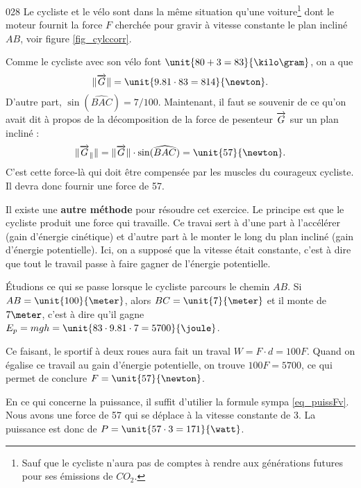 \begin{corrige}{028}
Le cycliste et le vélo sont dans la même situation qu'une voiture\footnote{Sauf que le cycliste n'aura pas de comptes à rendre aux générations futures pour ses émissions de $CO_2$.} dont le moteur fournit la force $F$ cherchée pour gravir à vitesse constante le plan incliné $AB$, voir figure \ref{fig_cylccorr}. 

Comme le cycliste avec son vélo font $\unit{80+3=83}{\kilo\gram}$, on a que
\[
 \| \fG \|=\unit{9.81\cdot 83=814}{\newton}.
\]
 D'autre part, $\sin(\widehat{BAC})=7/100$. Maintenant, il faut se souvenir de ce qu'on avait dit à propos de la décomposition de la force de pesenteur $\overrightarrow{G}$ sur un plan incliné :
\[ 
  \| \fG_{\parallel}\|=\| \fG \|\cdot\sin(\widehat{BAC}) =\unit{57}{\newton}. 
\]
C'est cette force-là qui doit être compensée par les muscles du courageux cycliste. Il devra donc fournir une force de \unit{57}{\newton}.


Il existe une {\bf autre méthode} pour résoudre cet exercice. Le principe est que le cycliste produit une force qui travaille. Ce travai sert à d'une part à l'accélérer (gain d'énergie cinétique) et d'autre part à le monter le long du plan incliné (gain d'énergie potentielle). Ici, on a supposé que la vitesse était constante, c'est à dire que tout le travail passe à faire gagner de l'énergie potentielle.

Étudions ce qui se passe lorsque le cycliste parcours le chemin $AB$. Si $AB=\unit{100}{\meter}$, alors $BC=\unit{7}{\meter}$ et il monte de $7\meter$, c'est à dire qu'il gagne $E_p=mgh=\unit{83\cdot 9.81\cdot 7=5700}{\joule}$. 

Ce faisant, le sportif à deux roues aura fait un traval $W=F\cdot d=100F$. Quand on égalise ce travail au gain d'énergie potentielle, on trouve $100F=5700$, ce qui permet de conclure $F=\unit{57}{\newton}$.

En ce qui concerne la puissance, il suffit d'utilier la formule sympa \eqref{eq_puissFv}. Nous avons une force de \unit{57}{\newton} qui se déplace à la vitesse constante de \unit{3}{\meter\per\second}. La puissance est donc de $P=\unit{57\cdot 3=171}{\watt}$.


\end{corrige}
